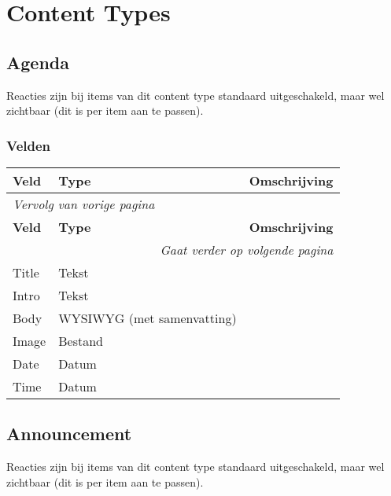 \section{Content Types}

\subsection{Agenda}
\label{sec:content-agenda}
Reacties zijn bij items van dit content type standaard uitgeschakeld, maar wel zichtbaar (dit is per item aan te passen).

\subsubsection{Velden}
  \begin{longtable}{| p{3.75cm}|p{3.75cm}|p{7.50cm}|}
  \hline
  \rowcolor{tableheader}
  \textbf{Veld} & \textbf{Type} & \textbf{Omschrijving}  \tabularnewline
  \hline
\endfirsthead
\multicolumn{3}{l}{\textit{Vervolg van vorige pagina}} \\
\hline
\rowcolor{tableheader}
  \textbf{Veld} & \textbf{Type} & \textbf{Omschrijving}  \tabularnewline
  \hline
\hline
\endhead
\multicolumn{3}{r}{\textit{Gaat verder op volgende pagina}} \\
\endfoot
\hline
\endlastfoot
  \raggedright{Title} & \raggedright{Tekst} & \raggedright{}  \tabularnewline
  \hline
  \raggedright{Intro} & \raggedright{Tekst} & \raggedright{}  \tabularnewline
  \hline
  \raggedright{Body} & \raggedright{WYSIWYG (met samenvatting)} & \raggedright{}  \tabularnewline
  \hline
  \raggedright{Image} & \raggedright{Bestand} & \raggedright{}  \tabularnewline
  \hline
  \raggedright{Date} & \raggedright{Datum} & \raggedright{}  \tabularnewline
  \hline
  \raggedright{Time} & \raggedright{Datum} & \raggedright{}  \tabularnewline
  \hline
  \end{longtable}

\subsection{Announcement}
\label{sec:content-announcement}
Reacties zijn bij items van dit content type standaard uitgeschakeld, maar wel zichtbaar (dit is per item aan te passen).


